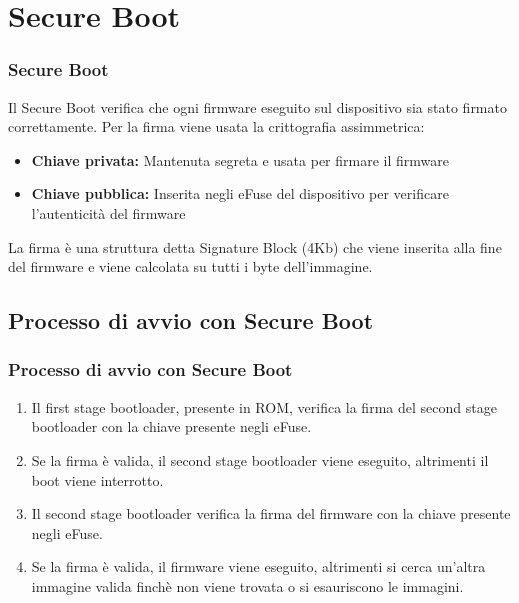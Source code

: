 \documentclass{beamer}
\begin{document}
\section{Secure Boot}
\begin{frame}
\frametitle{Secure Boot}
Il Secure Boot verifica che ogni firmware eseguito sul dispositivo sia stato firmato
correttamente. Per la firma viene usata la crittografia assimmetrica:
\begin{itemize}
  \item \textbf{Chiave privata:} Mantenuta segreta e usata per firmare il firmware
  \item \textbf{Chiave pubblica:} Inserita negli eFuse del dispositivo per verificare
    l'autenticità del firmware
\end{itemize}
La firma è una struttura detta Signature Block (4Kb) che viene inserita alla fine
del firmware e viene calcolata su tutti i byte dell'immagine.
\end{frame}

\subsection{Processo di avvio con Secure Boot}
\begin{frame}
\frametitle{Processo di avvio con Secure Boot}
\begin{enumerate}
  \item Il first stage bootloader, presente in ROM, verifica la firma del second stage
    bootloader con la chiave presente negli eFuse.
  \item Se la firma è valida, il second stage bootloader viene eseguito,
    altrimenti il boot viene interrotto.
  \item Il second stage bootloader verifica la firma del firmware con la chiave
    presente negli eFuse.
  \item Se la firma è valida, il firmware viene eseguito,
    altrimenti si cerca un'altra immagine valida finchè non viene trovata o si
    esauriscono le immagini.
\end{enumerate}
\end{frame}
\end{document}
